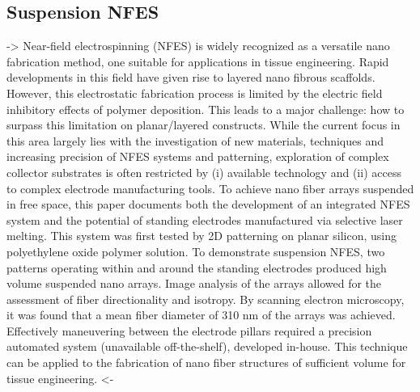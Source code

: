 \documentclass[5p,,preprint,12pt,twocolumn]{elsarticle}
\begin{document}
\subsection{Suspension NFES \unskip~\protect\cite{527120:12033656}}-{\textgreater} Near-field electrospinning (NFES) is widely recognized as a versatile nano fabrication method, one suitable for applications in tissue engineering. Rapid developments in this field have given rise to layered nano fibrous scaffolds. However, this electrostatic fabrication process is limited by the electric field inhibitory effects of polymer deposition. This leads to a major challenge: how to surpass this limitation on planar/layered constructs. While the current focus in this area largely lies with the investigation of new materials, techniques and increasing precision of NFES systems and patterning, exploration of complex collector substrates is often restricted by (i) available technology and (ii) access to complex electrode manufacturing tools. To achieve nano fiber arrays suspended in free space, this paper documents both the development of an integrated NFES system and the potential of standing electrodes manufactured via selective laser melting. This system was first tested by 2D patterning on planar silicon, using polyethylene oxide polymer solution. To demonstrate suspension NFES, two patterns operating within and around the standing electrodes produced high volume suspended nano arrays. Image analysis of the arrays allowed for the assessment of fiber directionality and isotropy. By scanning electron microscopy, it was found that a mean fiber diameter of 310 nm of the arrays was achieved. Effectively maneuvering between the electrode pillars required a precision automated system (unavailable off-the-shelf), developed in-house. This technique can be applied to the fabrication of nano fiber structures of sufficient volume for tissue engineering. {\textless}-
\end{document}
